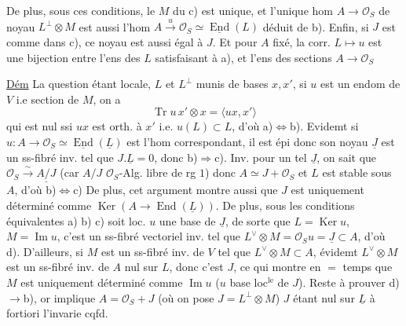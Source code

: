 De plus, sous ces conditions, le $M$ du c) est unique, et l'unique hom $A\longrightarrow\mathcal O_S$ de noyau $L^\perp\otimes M$  est aussi l'hom $A\xrightarrow{u}\mathcal O_S\simeq\underline{\operatorname{End}}(L)$ déduit de b).
Enfin, si $J$ est comme dans c), ce noyau est aussi égal à $J$. Et pour $A$ fixé, la corr. $L\mapsto u$ est une bijection entre l'ens des $L$ satisfaisant à a), et l'ens des sections  $A\to\mathcal O_S$

\uline{Dém} La question étant locale,  $L$  et $L^\perp$ munis de bases $x,x'$,  si $u$ est  un endom de $V$ i.e section de $M$, on a
\[
 \operatorname{Tr}u\,x'\otimes x=\langle ux,x'\rangle
\]
qui est nul ssi $ux$ est orth. à $x'$ i.e. $u(L)\subset L$, d'où a)$\Longleftrightarrow$b). Evidemt si $u:A\to\mathcal O_S\simeq\underline{\operatorname{End}}(\underline L)$ est l'hom correspondant, il est épi donc son noyau $\underline J$ est un ss-fibré inv. tel que $J.\underline L=0$, donc b)$\Rightarrow$c).
Inv. pour un tel $\underline J$, on sait  que $\mathcal O_S\xrightarrow{\sim}\underline{A/J}$ (car $A/J$ $\mathcal O_S$-Alg. libre de rg $1$) donc $A\simeq J+\mathcal O_S$ et $L$ est stable sous $A$, d'où b)$\Longleftrightarrow$c)
De plus, cet argument montre aussi que $J$ est uniquement déterminé comme $\operatorname{Ker}(A\to\operatorname{End}(\underline L))$.
De plus, sous les conditions équivalentes a) b) c)  soit loc. $u$ une base de $\underline J$,  de sorte que $L=\operatorname{Ker}u$,  $M=\operatorname{Im}u$, c'est un ss-fibré vectoriel inv. tel que  $L^\vee\otimes M=\mathcal O_Su=\underline J\subset A$, d'où d).
D'ailleurs, si $M$ est un ss-fibré inv. de $V$ tel que $L^\vee\otimes M\subset A$, évidemt $L^\vee\otimes M$ est un ss-fibré inv. de $A$ nul sur $L$, donc c'est $J$, ce qui montre en $=$ temps que $M$ est uniquement déterminé comme $\operatorname{Im}u$ ($u$ base loc$^{\mathrm{le}}$ de $J$).
Reste à prouver d)$\longrightarrow$b), or  implique $A=\mathcal O_S+J$ (où on pose $J=L^\perp\otimes M$)  $J$ étant nul sur  $\underline L$ à fortiori l'invarie cqfd.


